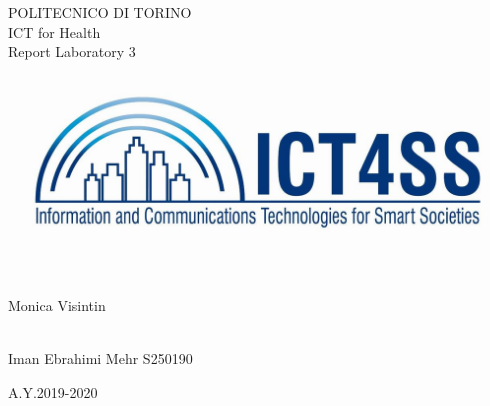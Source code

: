 \documentclass[a4paper,12pt,oneside,titlepage]{article}
\begin{document}
	
	\thispagestyle{empty}
	\setcounter{page}{0}
	
	\begin{center}
		\huge
		POLITECNICO DI TORINO\\[1.cm]
		\Large
		ICT for Health \\
		\vspace{0.5cm}
		\Large
		Report Laboratory 3\\[1.3cm]
		
		\vspace{0.5cm}
		\includegraphics[scale=2]{logo.jpg}
	\end{center}
	\vspace{1.cm}
	
	\begin{flushleft}
		\Large
		\\
		Monica Visintin\\[0.2cm]
	\end{flushleft}
	\vspace{1cm}
	
	
	\begin{flushright} 
		\Large
		\\
		Iman Ebrahimi Mehr S250190\\[0.2cm]
	\end{flushright} 
	\vspace{2cm}
	\begin{center}
		\Large
		A.Y.2019-2020
	\end{center}
	
	\newpage
	\thispagestyle{empty}
	\tableofcontents

	
	\newpage
\end{document}

